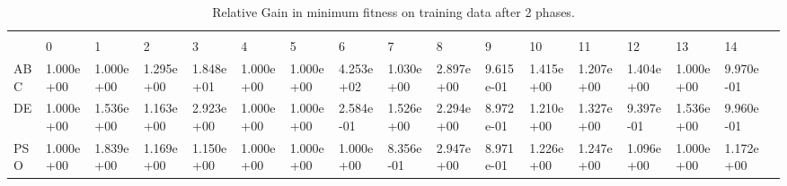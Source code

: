 \begin{landscape}
\begin{table}[]
\centering
\caption{Relative Gain in minimum fitness on training data after 2 phases.}
\label{table:2phasemintrain}
\begin{adjustbox}{width=1.7\textwidth}
\begin{tabular}{lllllllllllllllll}
          &           &           &           &           &           &           &           &           &           &           &           &           &           &           &           &  \\
           & 0         & 1         & 2         & 3         & 4         & 5         & 6         & 7         & 8         & 9         & 10        & 11        & 12        & 13        & 14        &  \\
ABC                 & 1.000e+00 & 1.000e+00 & 1.295e+00 & 1.848e+01 & 1.000e+00 & 1.000e+00 & 4.253e+02 & 1.030e+00 & 2.897e+00 & 9.615e-01 & 1.415e+00 & 1.207e+00 & 1.404e+00 & 1.000e+00 & 9.970e-01 &  \\
DE                  & 1.000e+00 & 1.536e+00 & 1.163e+00 & 2.923e+00 & 1.000e+00 & 1.000e+00 & 2.584e-01 & 1.526e+00 & 2.294e+00 & 8.972e-01 & 1.210e+00 & 1.327e+00 & 9.397e-01 & 1.536e+00 & 9.960e-01 &  \\
PSO                 & 1.000e+00 & 1.839e+00 & 1.169e+00 & 1.150e+00 & 1.000e+00 & 1.000e+00 & 1.000e+00 & 8.356e-01 & 2.947e+00 & 8.971e-01 & 1.226e+00 & 1.247e+00 & 1.096e+00 & 1.000e+00 & 1.172e+00 &  \\

\end{tabular}
\end{adjustbox}
\end{table}


\end{landscape}
